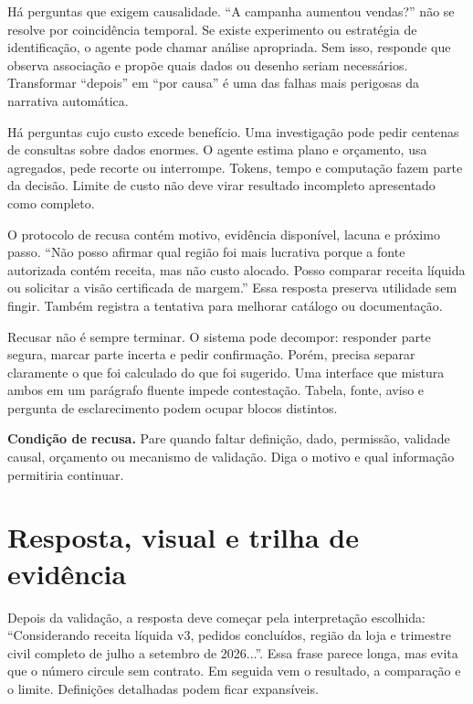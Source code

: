 Há perguntas que exigem causalidade. ``A campanha aumentou vendas?'' não se resolve por coincidência temporal. Se existe experimento ou estratégia de identificação, o agente pode chamar análise apropriada. Sem isso, responde que observa associação e propõe quais dados ou desenho seriam necessários. Transformar ``depois'' em ``por causa'' é uma das falhas mais perigosas da narrativa automática.

Há perguntas cujo custo excede benefício. Uma investigação pode pedir centenas de consultas sobre dados enormes. O agente estima plano e orçamento, usa agregados, pede recorte ou interrompe. Tokens, tempo e computação fazem parte da decisão. Limite de custo não deve virar resultado incompleto apresentado como completo.

O protocolo de recusa contém motivo, evidência disponível, lacuna e próximo passo. ``Não posso afirmar qual região foi mais lucrativa porque a fonte autorizada contém receita, mas não custo alocado. Posso comparar receita líquida ou solicitar a visão certificada de margem.'' Essa resposta preserva utilidade sem fingir. Também registra a tentativa para melhorar catálogo ou documentação.

Recusar não é sempre terminar. O sistema pode decompor: responder parte segura, marcar parte incerta e pedir confirmação. Porém, precisa separar claramente o que foi calculado do que foi sugerido. Uma interface que mistura ambos em um parágrafo fluente impede contestação. Tabela, fonte, aviso e pergunta de esclarecimento podem ocupar blocos distintos.

\begin{GuidedBox}
\textbf{Condição de recusa.} Pare quando faltar definição, dado, permissão, validade causal, orçamento ou mecanismo de validação. Diga o motivo e qual informação permitiria continuar.
\end{GuidedBox}

\section{Resposta, visual e trilha de evidência}

Depois da validação, a resposta deve começar pela interpretação escolhida: ``Considerando receita líquida v3, pedidos concluídos, região da loja e trimestre civil completo de julho a setembro de 2026...''. Essa frase parece longa, mas evita que o número circule sem contrato. Em seguida vem o resultado, a comparação e o limite. Definições detalhadas podem ficar expansíveis.

